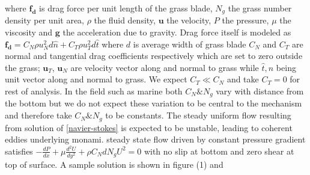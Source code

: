 \documentclass[aps,prl,twocolumn,showpacs,superscriptaddress,groupedaddress,10pt]{revtex4-1}  %
\newcommand{\bu}{\mathbf{u}}
\newcommand{\del}{\partial}
\begin{document}
where $\mathbf{f_{d}}$ is drag force per unit length of the grass blade, $N_g$ the grass number density per unit area, $\rho$ the fluid density, $\mathbf{u}$ the velocity, 
$P$ the pressure, $\mu$ the viscosity and $\mathbf{g}$ the acceleration due to gravity. Drag force itself is modeled 
as $\mathbf{f_{d}}=C_N \rho u_{N}^{2}d\hat{n}+C_{T}\rho u_{T}^{2}d\hat{t}$ where $d$ is average width of grass blade
$C_{N}$ and $C_{T}$ are normal and tangential drag coefficients respectively which are set to zero outside the grass; $\bu_{T}$, $\bu_{N}$ are velocity vector along and
normal to grass while $\hat{t},\hat{n}$ being unit vector along and normal to grass. We expect $C_T \ll C_N$ and take $C_T=0$ for rest of analysis. In the field such as marine
both $C_N \& N_g$ vary with distance from the bottom but we do not expect these variation to be central to the mechanism and therefore take $C_N \& N_g$ to be constants.
\newline
The steady uniform flow resulting from solution of \eqref{navier-stokes} is expected to be unstable, leading to coherent eddies underlying monami. steady state flow driven by   
constant pressure gradient satisfies
$-\frac{dP}{dx}+\mu\frac{d^2U}{dy^2}+\rho C_N d N_gU^2=0$ with no slip at bottom and zero shear at top of surface. A sample solution is shown in figure (1) and 
\end{document}
